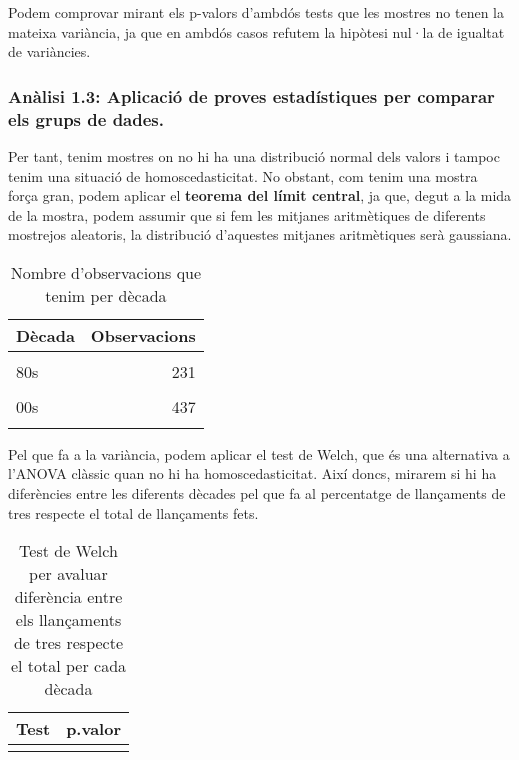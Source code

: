 \documentclass[
]{article}
\begin{document}
Podem comprovar mirant els p-valors d'ambdós tests que les mostres no
tenen la mateixa variància, ja que en ambdós casos refutem la hipòtesi
nul·la de igualtat de variàncies.

\hypertarget{anuxe0lisi-1.3-aplicaciuxf3-de-proves-estaduxedstiques-per-comparar-els-grups-de-dades.}{%
\subsubsection{Anàlisi 1.3: Aplicació de proves estadístiques per
comparar els grups de
dades.}\label{anuxe0lisi-1.3-aplicaciuxf3-de-proves-estaduxedstiques-per-comparar-els-grups-de-dades.}}

Per tant, tenim mostres on no hi ha una distribució normal dels valors i
tampoc tenim una situació de homoscedasticitat. No obstant, com tenim
una mostra força gran, podem aplicar el \textbf{teorema del límit
central}, ja que, degut a la mida de la mostra, podem assumir que si fem
les mitjanes aritmètiques de diferents mostrejos aleatoris, la
distribució d'aquestes mitjanes aritmètiques serà gaussiana.

\begin{table}[!h]

\caption{\label{tab:unnamed-chunk-19}Nombre d'observacions que tenim per dècada}
\centering
\begin{tabular}[t]{lr}
\toprule
Dècada & Observacions\\
\midrule
\cellcolor{gray!6}{Pre-three era} & \cellcolor{gray!6}{378}\\
80s & 231\\
\cellcolor{gray!6}{90s} & \cellcolor{gray!6}{308}\\
00s & 437\\
\cellcolor{gray!6}{10s} & \cellcolor{gray!6}{546}\\
\bottomrule
\end{tabular}
\end{table}

Pel que fa a la variància, podem aplicar el test de Welch, que és una
alternativa a l'ANOVA clàssic quan no hi ha homoscedasticitat. Així
doncs, mirarem si hi ha diferències entre les diferents dècades pel que
fa al percentatge de llançaments de tres respecte el total de
llançaments fets.

\begin{table}[!h]

\caption{\label{tab:unnamed-chunk-20}Test de Welch per avaluar diferència entre els llançaments de tres respecte el total per cada dècada}
\centering
\begin{tabular}[t]{lr}
\toprule
Test & p.valor\\
\midrule
\cellcolor{gray!6}{ANOVA de Welch} & \cellcolor{gray!6}{0}\\
\bottomrule
\end{tabular}
\end{table}
\end{document}
